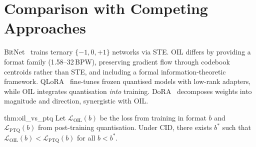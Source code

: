 \section{Comparison with Competing Approaches}
\label{sec:competing_approaches}
BitNet~\cite{wang2024} trains ternary $\{-1, 0, +1\}$ networks via STE.
OIL differs by providing a format family (1.58--32\,BPW), preserving gradient
flow through codebook centroids rather than STE, and including a formal
information-theoretic framework. QLoRA~\cite{dettmers2023} fine-tunes frozen
quantised models with low-rank adapters, while OIL integrates quantisation
\emph{into} training. DoRA~\cite{liu2024} decomposes weights into magnitude
and direction, synergistic with OIL.
\begin{mythm}{thm:oil_vs_ptq}
Let $\mathcal{L}_{\text{OIL}}(b)$ be the loss from training in format $b$
and $\mathcal{L}_{\text{PTQ}}(b)$ from post-training quantisation. Under CID,
there exists $b^*$ such that $\mathcal{L}_{\text{OIL}}(b) <
\mathcal{L}_{\text{PTQ}}(b)$ for all $b < b^*$.
\end{mythm}

